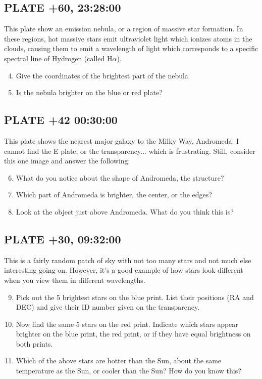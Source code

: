 \documentclass[11pt]{article}
\begin{document}
\subsection{PLATE +60, 23:28:00}
This plate show an emission nebula, or a region of massive star formation. In these regions, hot massive stars emit ultraviolet light which ionizes atoms in the clouds, causing them to emit a wavelength of light which corresponds to a specific spectral line of Hydrogen (called H$\alpha$).
\begin{enumerate}
\setcounter{enumi}{3}
    \item Give the coordinates of the brightest part of the nebula
    \item Is the nebula brighter on the blue or red plate?
\end{enumerate}

\subsection{PLATE +42 00:30:00}
This plate shows the nearest major galaxy to the Milky Way, Andromeda. I cannot find the E plate, or the transparency... which is frustrating. Still, consider this one image and answer the following:
\begin{enumerate}
\setcounter{enumi}{5}
    \item What do you notice about the shape of Andromeda, the structure?
    \item Which part of Andromeda is brighter, the center, or the edges?
    \item Look at the object just above Andromeda. What do you think this is?
\end{enumerate}

\subsection{PLATE +30, 09:32:00}
This is a fairly random patch of sky with not too many stars and not much else interesting going on. However, it's a good example of how stars look different when you view them in different wavelengths.
\begin{enumerate}
\setcounter{enumi}{8}
    \item Pick out the 5 brightest stars on the blue print. List their positions (RA and DEC) and give their ID number given on the transparency.
    \item Now find the same 5 stars on the red print. Indicate which stars appear brighter on the blue print, the red print, or if they have equal brightness on both prints.
    \item Which of the above stars are hotter than the Sun, about the same temperature as the Sun, or cooler than the Sun? How do you know this?
\end{enumerate}
\end{document}
